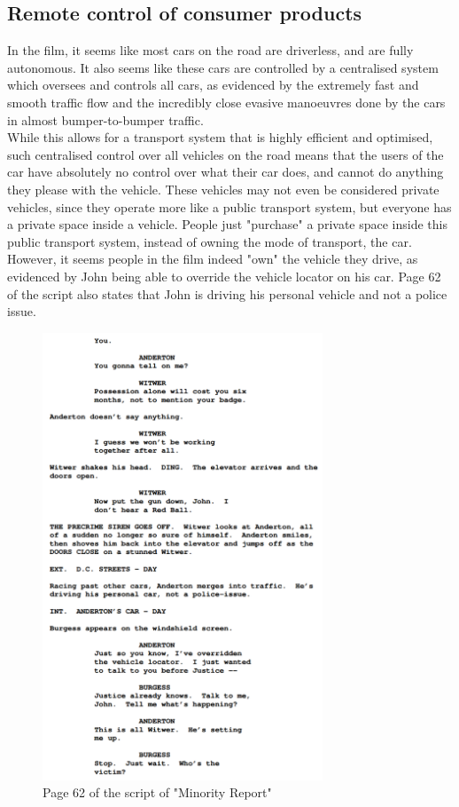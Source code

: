 \documentclass[11pt]{article}
\begin{document}
\subsection{Remote control of consumer products}
\label{sec:org666997e}
In the film, it seems like most cars on the road are driverless,
and are fully autonomous. It also seems like these cars are controlled
by a centralised system which oversees and controls all cars,
as evidenced by the extremely fast and smooth traffic flow
and the incredibly close evasive manoeuvres done by the cars in almost
bumper-to-bumper traffic.  \\

While this allows for a transport system that is highly efficient and
optimised, such centralised control over all vehicles on the road means
that the users of the car have absolutely no control over what their
car does, and cannot do anything they please with the vehicle.
These vehicles may not even be considered private vehicles, since they
operate more like a public transport system, but everyone
has a private space inside a vehicle. People just "purchase" a private
space inside this public transport system, instead
of owning the mode of transport, the car.  \\

However, it seems people in the film indeed "own" the
vehicle they drive, as evidenced by John being able to override the
vehicle locator on his car. Page 62 of the script also states that
John is driving his personal vehicle and not a police issue.

 \newpage

\begin{figure}[htbp]
\centering
\includegraphics[height=36em]{./images/minority-report-script-page-62.png}
\caption{Page 62 of the script of "Minority Report"}
\end{figure}
\end{document}
